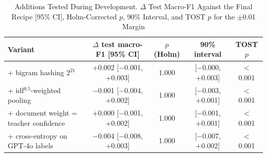 \documentclass[journal,onecolumn]{IEEEtran}
\begin{document}
\begin{table}[!htbp]
\caption{Licenses of the Assets Used and Released}
\label{tab:license}
\centering
\footnotesize
\setlength{\tabcolsep}{3pt}
\end{table}

\begin{table}[!htbp]
\caption{Additions Tested During Development. $\Delta$ Test Macro-F1 Against the Final Recipe [95\% CI], Holm-Corrected $p$, 90\% Interval, and TOST $p$ for the $\pm$0.01 Margin}
\label{tab:additions}
\centering
\footnotesize
\setlength{\tabcolsep}{4pt}
\begin{tabular}{@{}lcccc@{}}
\toprule
Variant & $\Delta$ test macro-F1 [95\% CI] & $p$ (Holm) & 90\% interval & TOST $p$ \\
\midrule
\quad + bigram hashing $2^{21}$ & +0.002 [$-$0.001, +0.003] & 1.000 & [$-$0.000, +0.003] & $<$0.001 \\
\quad + idf$^{0.5}$-weighted pooling & $-$0.001 [$-$0.004, +0.002] & 1.000 & [$-$0.003, +0.001] & $<$0.001 \\
\quad + document weight = teacher confidence & +0.000 [$-$0.001, +0.002] & 1.000 & [$-$0.001, +0.001] & $<$0.001 \\
\quad + cross-entropy on GPT-4o labels & $-$0.004 [$-$0.008, +0.003] & 1.000 & [$-$0.007, +0.002] & $<$0.001 \\
\bottomrule
\end{tabular}
\end{table}
\end{document}
